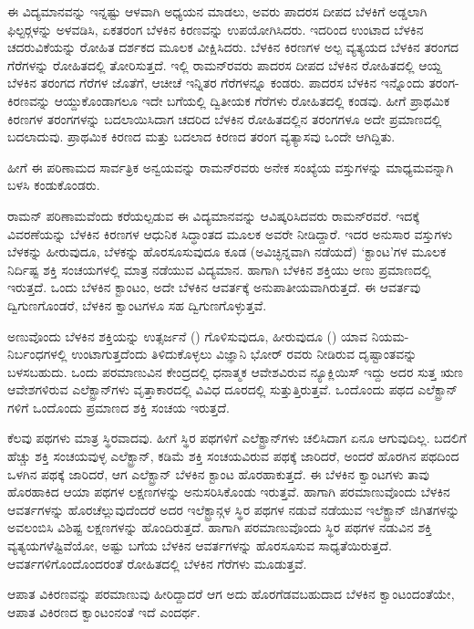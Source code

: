ಈ ವಿದ್ಯಮಾನವನ್ನು ಇನ್ನಷ್ಟು ಆಳವಾಗಿ ಅಧ್ಯಯನ ಮಾಡಲು, ಅವರು ಪಾದರಸ ದೀಪದ ಬೆಳಕಿಗೆ ಅಡ್ಡಲಾಗಿ ಫಿಲ್ಟರ್‍ಗಳನ್ನು ಅಳವಡಿಸಿ, ಏಕತರಂಗ ಬೆಳಕಿನ ಕಿರಣವನ್ನು ಉಪಯೋಗಿಸಿದರು. ಇದರಿಂದ ಉಂಟಾದ ಬೆಳಕಿನ ಚದರುವಿಕೆಯನ್ನು ರೋಹಿತ ದರ್ಶಕದ ಮೂಲಕ ವೀಕ್ಷಿಸಿದರು. ಬೆಳಕಿನ ಕಿರಣಗಳ ಅಲ್ಪ ವ್ಯತ್ಯಯದ ಬೆಳಕಿನ ತರಂಗದ ಗೆರೆಗಳನ್ನು ರೋಹಿತದಲ್ಲಿ ತೋರಿಸುತ್ತದೆ. ಇಲ್ಲಿ ರಾಮನ್‍ರವರು ಪಾದರಸ ದೀಪದ ಬೆಳಕಿನ ರೋಹಿತದಲ್ಲಿ ಆಯ್ದ ಬೆಳಕಿನ ತರಂಗದ ಗೆರೆಗಳ ಜೊತೆಗೆ, ಆಚೀಚೆ ಇನ್ನಿತರ ಗೆರೆಗಳನ್ನೂ ಕಂಡರು. ಪಾದರಸ ಬೆಳಕಿನ ಇನ್ನೊಂದು ತರಂಗ-ಕಿರಣವನ್ನು ಆಯ್ದುಕೊಂಡಾಗಲೂ ಇದೇ ಬಗೆಯಲ್ಲಿ ದ್ವಿತೀಯಕ ಗೆರೆಗಳು ರೋಹಿತದಲ್ಲಿ ಕಂಡವು. ಹೀಗೆ ಪ್ರಾಥಮಿಕ ಕಿರಣಗಳ ತರಂಗಗಳನ್ನು ಬದಲಾಯಿಸಿದಾಗ ಚದರಿದ ಬೆಳಕಿನ ರೋಹಿತದಲ್ಲಿನ ತರಂಗಗಳೂ ಅದೇ ಪ್ರಮಾಣದಲ್ಲಿ ಬದಲಾದುವು. ಪ್ರಾಥಮಿಕ ಕಿರಣದ ಮತ್ತು ಬದಲಾದ ಕಿರಣದ ತರಂಗ ವ್ಯತ್ಯಾಸವು ಒಂದೇ ಆಗಿದ್ದಿತು.

ಹೀಗೆ ಈ ಪರಿಣಾಮದ ಸಾರ್ವತ್ರಿಕ ಅನ್ವಯವನ್ನು ರಾಮನ್‍ರವರು ಅನೇಕ ಸಂಖ್ಯೆಯ ವಸ್ತುಗಳನ್ನು ಮಾಧ್ಯಮವನ್ನಾಗಿ ಬಳಸಿ ಕಂಡುಕೊಂಡರು.

ರಾಮನ್ ಪರಿಣಾಮವೆಂದು ಕರೆಯಲ್ಪಡುವ ಈ ವಿದ್ಯಮಾನವನ್ನು ಆವಿಷ್ಕರಿಸಿದವರು ರಾಮನ್‍ರವರೆ. ಇದಕ್ಕೆ ವಿವರಣೆಯನ್ನು ಬೆಳಕಿನ ಕಿರಣಗಳ ಆಧುನಿಕ ಸಿದ್ಧಾಂತದ ಮೂಲಕ ಅವರೇ ನೀಡಿದ್ದಾರೆ. ಇದರ ಅನುಸಾರ ವಸ್ತುಗಳು ಬೆಳಕನ್ನು ಹೀರುವುದೂ, ಬೆಳಕನ್ನು ಹೊರಸೂಸುವುದೂ ಕೂಡ (ಅವಿಚ್ಛಿನ್ನವಾಗಿ ನಡೆಯದೆ) ‘ಕ್ಟಾಂಟ’ಗಳ ಮೂಲಕ ನಿರ್ದಿಷ್ಟ ಶಕ್ತಿ ಸಂಚಯಗಳಲ್ಲಿ ಮಾತ್ರ ನಡೆಯುವ ವಿದ್ಯಮಾನ. ಹಾಗಾಗಿ ಬೆಳಕಿನ ಶಕ್ತಿಯು ಅಣು ಪ್ರಮಾಣದಲ್ಲಿ ಇರುತ್ತದೆ. ಒಂದು ಬೆಳಕಿನ ಕ್ಟಾಂಟಂ, ಅದೇ ಬೆಳಕಿನ ಆವರ್ತಕ್ಕೆ ಅನುಪಾತೀಯವಾಗಿರುತ್ತದೆ. ಈ ಆವರ್ತವು ದ್ವಿಗುಣಗೊಂಡರೆ, ಬೆಳಕಿನ ಕ್ವಾಂಟಗಳೂ ಸಹ ದ್ವಿಗುಣಗೊಳ್ಳುತ್ತವೆ.

ಅಣುವೊಂದು ಬೆಳಕಿನ ಶಕ್ತಿಯನ್ನು ಉತ್ಸರ್ಜನೆ () ಗೊಳಿಸುವುದೂ, ಹೀರುವುದೂ () ಯಾವ ನಿಯಮ-ನಿರ್ಬಂಧಗಳಲ್ಲಿ ಉಂಟಾಗುತ್ತದೆಂದು ತಿಳಿದುಕೊಳ್ಳಲು ವಿಜ್ಞಾನಿ ಭೋರ್ ರವರು ನೀಡಿರುವ ದೃಷ್ಟಾಂತವನ್ನು ಬಳಸಬಹುದು. ಒಂದು ಪರಮಾಣುವಿನ ಕೇಂದ್ರದಲ್ಲಿ ಧನಾತ್ಮಕ ಆವೇಶವಿರುವ ನ್ಯೂಕ್ಲಿಯಿಸ್ ಇದ್ದು ಅದರ ಸುತ್ತ ಋಣ ಆವೇಶಗಳಿರುವ ಎಲೆಕ್ಟ್ರಾನ್‍ಗಳು ವೃತ್ತಾಕಾರದಲ್ಲಿ ವಿವಿಧ ದೂರದಲ್ಲಿ ಸುತ್ತುತ್ತಿರುತ್ತವೆ. ಒಂದೊಂದು ಪಥದ ಎಲೆಕ್ಟ್ರಾನ್ ಗಳಿಗೆ ಒಂದೊಂದು ಪ್ರಮಾಣದ ಶಕ್ತಿ ಸಂಚಯ ಇರುತ್ತದೆ.

ಕೆಲವು ಪಥಗಳು ಮಾತ್ರ ಸ್ಥಿರವಾದವು. ಹೀಗೆ ಸ್ಥಿರ ಪಥಗಳಿಗೆ ಎಲೆಕ್ಟ್ರಾನ್‍ಗಳು ಚಲಿಸಿದಾಗ ಏನೂ ಆಗುವುದಿಲ್ಲ. ಬದಲಿಗೆ ಹೆಚ್ಚು ಶಕ್ತಿ ಸಂಚಯವುಳ್ಳ ಎಲೆಕ್ಟ್ರಾನ್, ಕಡಿಮೆ ಶಕ್ತಿ ಸಂಚಯವಿರುವ ಪಥಕ್ಕೆ ಜಾರಿದರೆ, ಅಂದರೆ ಹೊರಗಿನ ಪಥದಿಂದ ಒಳಗಿನ ಪಥಕ್ಕೆ ಜಾರಿದರೆ, ಆಗ ಎಲೆಕ್ಟ್ರಾನ್ ಬೆಳಕಿನ ಕ್ಟಾಂಟ ಹೊರಹಾಕುತ್ತದೆ. ಈ ಬೆಳಕಿನ ಕ್ವಾಂಟಗಳು ತಾವು ಹೊರಹಾಕಿದ ಆಯಾ ಪಥಗಳ ಲಕ್ಷಣಗಳನ್ನು ಅನುಸರಿಸಿಕೊಂಡು ಇರುತ್ತವೆ. ಹಾಗಾಗಿ ಪರಮಾಣುವೊಂದು ಬೆಳಕಿನ ಆವರ್ತಗಳನ್ನು ಹೊರಚೆಲ್ಲುವುದೆಂದರೆ ಅದರ ಇಲೆಕ್ಟ್ರಾನ್ಗಳ ಸ್ಥಿರ ಪಥಗಳ ನಡುವೆ ನಡೆಯುವ ಇಲೆಕ್ಟ್ರಾನ್ ಜಿಗಿತಗಳನ್ನು ಅವಲಂಬಿಸಿ ವಿಶಿಷ್ಟ ಲಕ್ಷಣಗಳನ್ನು ಹೊಂದಿರುತ್ತದೆ. ಹಾಗಾಗಿ ಪರಮಾಣುವೊಂದು ಸ್ಥಿರ ಪಥಗಳ ನಡುವಿನ ಶಕ್ತಿ ವ್ಯತ್ಯಯಗಳೆಷ್ಟಿವೆಯೋ, ಅಷ್ಟು ಬಗೆಯ ಬೆಳಕಿನ ಆವರ್ತಗಳನ್ನು ಹೊರಸೂಸುವ ಸಾಧ್ಯತೆಯಿರುತ್ತದೆ. ಆವರ್ತಗಳಿಗೊಂದೊಂದರಂತೆ ರೋಹಿತದಲ್ಲಿ ಬೆಳಕಿನ ಗೆರೆಗಳು ಮೂಡುತ್ತವೆ.

ಆಪಾತ ವಿಕಿರಣವನ್ನು ಪರಮಾಣುವು ಹೀರಿದ್ದಾದರೆ ಆಗ ಅದು ಹೊರಗೆಡವಬಹುದಾದ ಬೆಳಕಿನ ಕ್ವಾಂಟಂದಂತೆಯೇ, ಆಪಾತ ವಿಕಿರಣದ ಕ್ವಾಂಟಂನಂತೆ ಇದೆ ಎಂದರ್ಥ.


